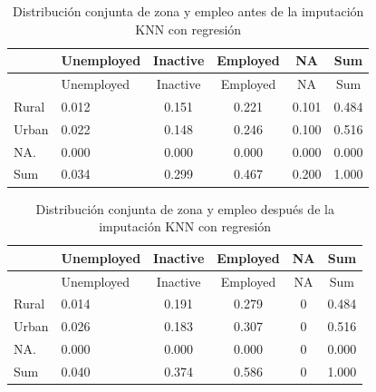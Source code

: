 \documentclass[
  spanish,
  12pt,
]{book}
\newenvironment{Shaded}{\begin{snugshade}}{\end{snugshade}}
\newcommand{\AttributeTok}[1]{\textcolor[rgb]{0.13,0.29,0.53}{#1}}
\newcommand{\FunctionTok}[1]{\textcolor[rgb]{0.13,0.29,0.53}{\textbf{#1}}}
\newcommand{\NormalTok}[1]{#1}
\newcommand{\SpecialCharTok}[1]{\textcolor[rgb]{0.81,0.36,0.00}{\textbf{#1}}}
\newcommand{\StringTok}[1]{\textcolor[rgb]{0.31,0.60,0.02}{#1}}
\begin{document}
\begin{longtable}[]{@{}llcccc@{}}
\caption{\label{tab:tab-knn-reg-zona-antes}Distribución conjunta de zona y empleo antes de la imputación KNN con regresión}\tabularnewline
\toprule\noalign{}
& Unemployed & Inactive & Employed & NA & Sum \\
\midrule\noalign{}
\endfirsthead
\toprule\noalign{}
& Unemployed & Inactive & Employed & NA & Sum \\
\midrule\noalign{}
\endhead
\bottomrule\noalign{}
\endlastfoot
Rural & 0.012 & 0.151 & 0.221 & 0.101 & 0.484 \\
Urban & 0.022 & 0.148 & 0.246 & 0.100 & 0.516 \\
NA. & 0.000 & 0.000 & 0.000 & 0.000 & 0.000 \\
Sum & 0.034 & 0.299 & 0.467 & 0.200 & 1.000 \\
\end{longtable}

\begin{Shaded}
\end{Shaded}

\begin{longtable}[]{@{}llcccc@{}}
\caption{\label{tab:tab-knn-reg-zona-despues}Distribución conjunta de zona y empleo después de la imputación KNN con regresión}\tabularnewline
\toprule\noalign{}
& Unemployed & Inactive & Employed & NA & Sum \\
\midrule\noalign{}
\endfirsthead
\toprule\noalign{}
& Unemployed & Inactive & Employed & NA & Sum \\
\midrule\noalign{}
\endhead
\bottomrule\noalign{}
\endlastfoot
Rural & 0.014 & 0.191 & 0.279 & 0 & 0.484 \\
Urban & 0.026 & 0.183 & 0.307 & 0 & 0.516 \\
NA. & 0.000 & 0.000 & 0.000 & 0 & 0.000 \\
Sum & 0.040 & 0.374 & 0.586 & 0 & 1.000 \\
\end{longtable}
\end{document}
